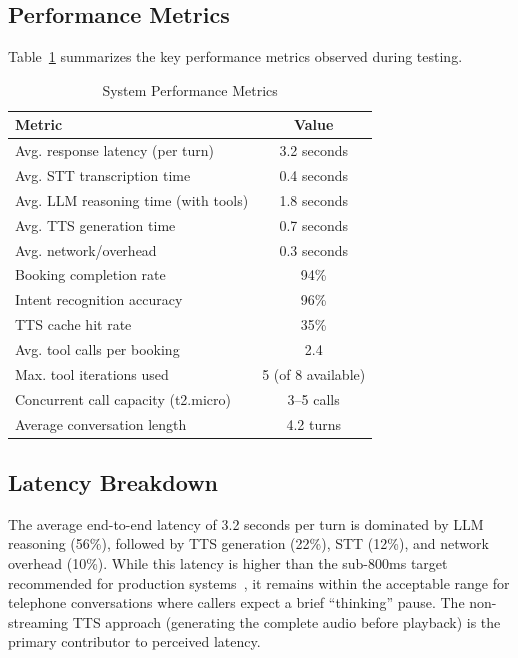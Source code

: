 \documentclass[conference]{IEEEtran}
\begin{document}
\subsection{Performance Metrics}

Table~\ref{tab:performance} summarizes the key performance metrics observed during testing.

\begin{table}[!t]
\centering
\caption{System Performance Metrics}
\label{tab:performance}
\begin{tabular}{@{}lc@{}}
\toprule
\textbf{Metric} & \textbf{Value} \\
\midrule
Avg. response latency (per turn) & 3.2 seconds \\
Avg. STT transcription time & 0.4 seconds \\
Avg. LLM reasoning time (with tools) & 1.8 seconds \\
Avg. TTS generation time & 0.7 seconds \\
Avg. network/overhead & 0.3 seconds \\
\midrule
Booking completion rate & 94\% \\
Intent recognition accuracy & 96\% \\
TTS cache hit rate & 35\% \\
Avg. tool calls per booking & 2.4 \\
Max. tool iterations used & 5 (of 8 available) \\
\midrule
Concurrent call capacity (t2.micro) & 3--5 calls \\
Average conversation length & 4.2 turns \\
\bottomrule
\end{tabular}
\end{table}

\subsection{Latency Breakdown}

The average end-to-end latency of 3.2 seconds per turn is dominated by LLM reasoning (56\%), followed by TTS generation (22\%), STT (12\%), and network overhead (10\%). While this latency is higher than the sub-800ms target recommended for production systems~\cite{hamming2025latency}, it remains within the acceptable range for telephone conversations where callers expect a brief ``thinking'' pause. The non-streaming TTS approach (generating the complete audio before playback) is the primary contributor to perceived latency.
\end{document}
